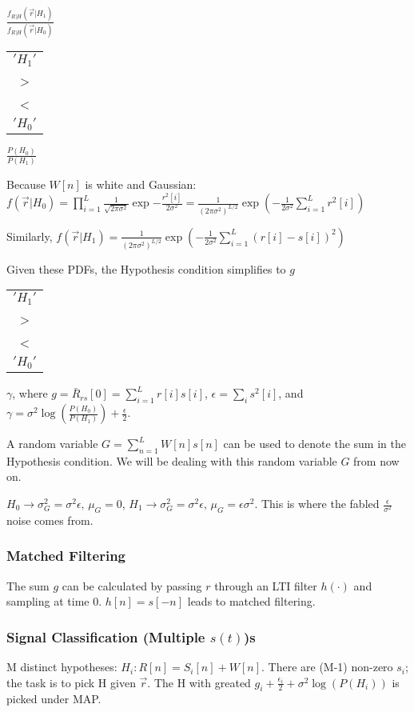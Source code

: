 \documentclass[8pt]{extarticle}
\begin{document}
\begin{multicols*}{3}
\begin{center}
\( \frac{f_{R|H}(\vec{r}|H_1)}{f_{R|H}(\vec{r}|H_0)} \) \begin{tabular}{c} \( 'H_1' \) \\ > \\ < \\ \('H_0'\) \\ \end{tabular} \( \frac{P(H_0)}{P(H_1)} \)

Because \( W[n] \) is white and Gaussian:
\( f(\vec{r}|H_0) = \prod_{i=1}^{L} \frac{1}{\sqrt{2\pi \sigma^2}} \exp{-\frac{r^2[i]}{2\sigma^2}} = \frac{1}{(2\pi \sigma^2)^{L/2}} \exp{\left(-\frac{1}{2\sigma^2} \sum_{i=1}^L r^2[i]\right)} \)

Similarly, \( f(\vec{r}|H_1) = \frac{1}{(2\pi \sigma^2)^{L/2}} \exp{\left(-\frac{1}{2\sigma^2} \sum_{i=1}^L (r[i]-s[i])^2\right)} \)

Given these PDFs, the Hypothesis condition simplifies to \( g \) \begin{tabular}{c} \( 'H_1' \) \\ > \\ < \\ \('H_0'\) \\ \end{tabular} \( \gamma \), where \( g = \bar{R}_{rs}[0] = \sum_{i=1}^{L} r[i] s[i] \), \( \epsilon = \sum_i s^2[i] \), and \( \gamma = \sigma^2 \log{\left(\frac{P(H_0)}{P(H_1)}\right)} + \frac{\epsilon}{2} \).

A random variable \( G = \sum_{n=1}^{L} W[n]s[n] \) can be used to denote the sum in the Hypothesis condition. We will be dealing with this random variable \( G \) from now on.

\( H_0 \rightarrow \sigma_G^2 = \sigma^2\epsilon\text{, } \mu_G = 0 \), \( H_1 \rightarrow \sigma_G^2 = \sigma^2\epsilon\text{, } \mu_G = \epsilon \sigma^2 \). This is where the fabled \( \frac{\epsilon}{\sigma^2} \) noise comes from.

\subsubsection{Matched Filtering}
The sum \( g \) can be calculated by passing \( r \) through an LTI filter \( h(\cdot) \) and sampling at time 0. \( h[n] = s[-n] \) leads to matched filtering.

\subsubsection{Signal Classification (Multiple \( s(t) \))s}
M distinct hypotheses: \( H_i: R[n] = S_i[n] + W[n] \). There are (M-1) non-zero \( s_i \); the task is to pick H given \( \vec{r} \). The H with greated \( g_i + \frac{\epsilon_i}{2} + \sigma^2\log{\left(P(H_i)\right)} \) is picked under MAP.


\end{center}
\end{multicols*}
\end{document}
